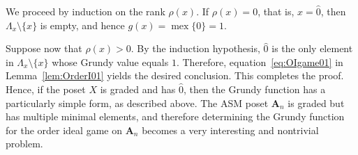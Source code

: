 \documentclass[a4paper,11pt]{amsart}
\theoremstyle{definition}
\newenvironment{demo}[1]{%
  \trivlist
  \item[\hskip\labelsep
        {\bf #1.}]
}{%
\hfill\qedsymbol
  \endtrivlist
}
\newcommand{\mex}{\operatorname{mex}}
\numberwithin{equation}{section}
\def\ASM#1{\boldsymbol{A}_{#1}}
\def\rkf{\rho}
\begin{document}
%
\begin{demo}{Proof}
%
We proceed by induction on the rank $\rkf(x)$.
If $\rkf(x)=0$, that is, $x=\hat0$, then $\Lambda_{x}\setminus\{x\}$ is empty, and hence
$g(x)=\mex\{ 0\}=1$.
\par
Suppose now that $\rkf(x)>0$. 
By the induction hypothesis, 
$\hat0$ is the only element in $\Lambda_{x}\setminus\{x\}$ whose Grundy value equals $1$.
Therefore, equation~\eqref{eq:OIgame01} in Lemma~\ref{lem:OrderI01} yields the desired conclusion.
%
This completes the proof.
\end{demo}
%
Hence, if the poset $X$ is graded and has $\hat0$, 
then the Grundy function has a particularly simple form, as described above.
The ASM poset $\ASM{n}$ is graded but has multiple minimal elements,
and therefore determining the Grundy function for the order ideal game on $\ASM{n}$
becomes a very interesting and nontrivial problem.
%

%
%
%
%
%
\end{document}

